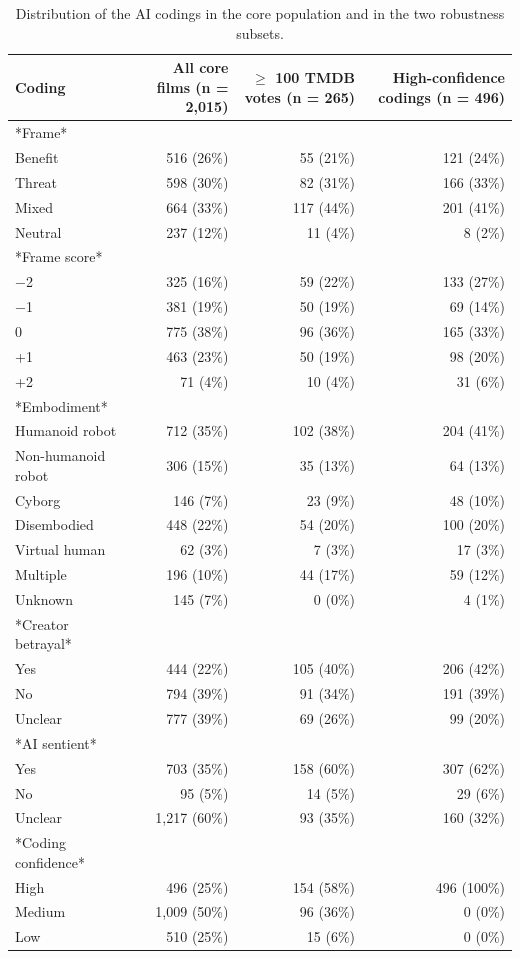 \begin{table}[htbp]
\centering
\caption{Distribution of the AI codings in the core population and in the two robustness subsets.}
\label{tab:coding_distributions}
\begin{tabular}{lrrr}
\toprule
Coding & All core films (n = 2,015) & $\geq$ 100 TMDB votes (n = 265) & High-confidence codings (n = 496) \\
\midrule
*Frame* &  &  &  \\
Benefit & 516 (26\%) & 55 (21\%) & 121 (24\%) \\
Threat & 598 (30\%) & 82 (31\%) & 166 (33\%) \\
Mixed & 664 (33\%) & 117 (44\%) & 201 (41\%) \\
Neutral & 237 (12\%) & 11 (4\%) & 8 (2\%) \\
*Frame score* &  &  &  \\
−2 & 325 (16\%) & 59 (22\%) & 133 (27\%) \\
−1 & 381 (19\%) & 50 (19\%) & 69 (14\%) \\
0 & 775 (38\%) & 96 (36\%) & 165 (33\%) \\
+1 & 463 (23\%) & 50 (19\%) & 98 (20\%) \\
+2 & 71 (4\%) & 10 (4\%) & 31 (6\%) \\
*Embodiment* &  &  &  \\
Humanoid robot & 712 (35\%) & 102 (38\%) & 204 (41\%) \\
Non-humanoid robot & 306 (15\%) & 35 (13\%) & 64 (13\%) \\
Cyborg & 146 (7\%) & 23 (9\%) & 48 (10\%) \\
Disembodied & 448 (22\%) & 54 (20\%) & 100 (20\%) \\
Virtual human & 62 (3\%) & 7 (3\%) & 17 (3\%) \\
Multiple & 196 (10\%) & 44 (17\%) & 59 (12\%) \\
Unknown & 145 (7\%) & 0 (0\%) & 4 (1\%) \\
*Creator betrayal* &  &  &  \\
Yes & 444 (22\%) & 105 (40\%) & 206 (42\%) \\
No & 794 (39\%) & 91 (34\%) & 191 (39\%) \\
Unclear & 777 (39\%) & 69 (26\%) & 99 (20\%) \\
*AI sentient* &  &  &  \\
Yes & 703 (35\%) & 158 (60\%) & 307 (62\%) \\
No & 95 (5\%) & 14 (5\%) & 29 (6\%) \\
Unclear & 1,217 (60\%) & 93 (35\%) & 160 (32\%) \\
*Coding confidence* &  &  &  \\
High & 496 (25\%) & 154 (58\%) & 496 (100\%) \\
Medium & 1,009 (50\%) & 96 (36\%) & 0 (0\%) \\
Low & 510 (25\%) & 15 (6\%) & 0 (0\%) \\
\bottomrule
\end{tabular}
\end{table}
